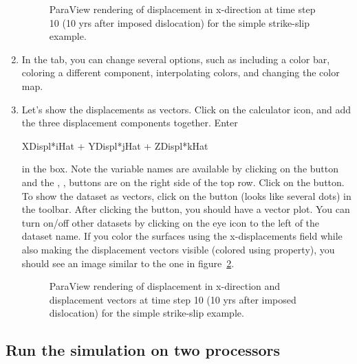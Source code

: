\begin{enumerate}
  \begin{figure}[htbp]
    \begin{center}
      \caption{ParaView rendering of displacement in x-direction at
          time step 10 (10 yrs after imposed dislocation) for the
          simple strike-slip example.}
      \label{fig:splittest:xdisp:t10}
    \end{center}
  \end{figure}
  
\item In the  tab, you can change several options,
  such as including a color bar, coloring a different component,
  interpolating colors, and changing the color map.
\item Let's show the displacements as vectors. Click on the calculator
  icon, and add the three displacement components together. Enter
  \begin{screen}
  XDispl*iHat + YDispl*jHat + ZDispl*kHat
  \end{screen}
  in the 
  box. Note the variable names are available by clicking on the
   button and the ,
  ,  buttons are on the right side of
  the top row. Click on the  button. To show the
  dataset as vectors, click on the  button (looks
  like several dots) in the toolbar. After clicking the
   button, you should have a vector plot. You can
  turn on/off other datasets by clicking on the eye icon to the left
  of the dataset name. If you color the surfaces using the
  x-displacements field while also making the displacement vectors
  visible (colored using property), you should see an image similar to
  the one in figure~\ref{fig:splittest:xdisp:vec:t10}.

  \begin{figure}[htbp]
    \begin{center}
      \caption{ParaView rendering of displacement in x-direction and
        displacement vectors at time step 10 (10 yrs after imposed
        dislocation) for the simple strike-slip example.}
      \label{fig:splittest:xdisp:vec:t10}
    \end{center}
  \end{figure}      

\end{enumerate}

\subsection{Run the simulation on two processors}

